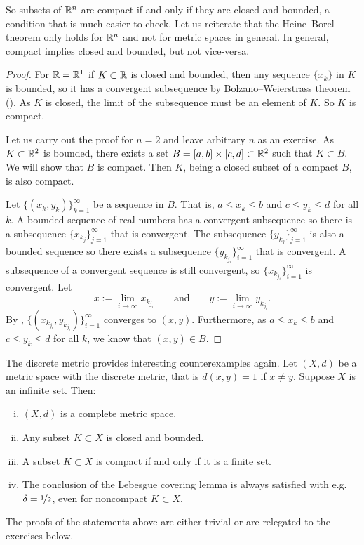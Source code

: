 So subsets of ${\mathbb{R}}^n$ are compact if and only if they are closed and bounded,
a condition that is much easier to check.
Let us reiterate that the Heine--Borel theorem only holds for ${\mathbb{R}}^n$ and not
for metric spaces in general.  In general, compact implies closed and
bounded, but not vice-versa.

\begin{proof}
For ${\mathbb{R}} = {\mathbb{R}}^1$ if $K \subset {\mathbb{R}}$ is closed and bounded, then
any sequence $\{ x_k \}$ in $K$ is bounded, so it has a convergent
subsequence by
Bolzano--Weierstrass theorem ().
As $K$ is closed, the limit of the subsequence must be an element of
$K$.  So $K$ is compact.

Let us carry out the proof for $n=2$ and leave arbitrary $n$ as an exercise.
As $K \subset {\mathbb{R}}^2$ is bounded, there exists a set
$B=[a,b]\times[c,d] \subset {\mathbb{R}}^2$ such that $K \subset B$.  We will show
that $B$ is compact.  Then $K$, being a closed subset of a compact $B$, is
also compact.  

Let $\bigl\{ (x_k,y_k) \bigr\}_{k=1}^\infty$ be a sequence in $B$.  That is,
$a \leq x_k \leq b$ and
$c \leq y_k \leq d$ for all $k$.  A bounded sequence of real numbers
has a convergent
subsequence so there is a subsequence $\{ x_{k_j} \}_{j=1}^\infty$
that is convergent.  The subsequence 
$\{ y_{k_j} \}_{j=1}^\infty$ is also a bounded sequence so there exists
a subsequence
$\{ y_{k_{j_i}} \}_{i=1}^\infty$ that is convergent.  A subsequence of a
convergent sequence is still convergent, so 
$\{ x_{k_{j_i}} \}_{i=1}^\infty$ is convergent.
Let
\begin{equation*}
x := \lim_{i\to\infty} x_{k_{j_i}}
\qquad \text{and} \qquad
y := \lim_{i\to\infty} y_{k_{j_i}} .
\end{equation*}
By ,
$\bigl\{ (x_{k_{j_i}},y_{k_{j_i}}) \bigr\}_{i=1}^\infty$ converges to $(x,y)$.
Furthermore, as $a \leq x_k \leq b$ and
$c \leq y_k \leq d$ for all $k$, we know that $(x,y) \in B$.
\end{proof}

\begin{example}
The discrete metric provides interesting counterexamples again.
Let $(X,d)$ be a metric space with the discrete metric, that is $d(x,y) = 1$
if $x \not= y$.  Suppose
$X$ is an infinite set.  Then:
\begin{enumerate}[(i)]
\item $(X,d)$ is a complete metric space.
\item Any subset $K \subset X$ is closed and bounded.
\item A subset $K \subset X$ is compact if and only if it is a finite set.
\item The conclusion of the Lebesgue covering lemma is always satisfied with
e.g. $\delta = \nicefrac{1}{2}$, even for noncompact $K \subset X$.
\end{enumerate}
The proofs
of the statements above are either trivial or are relegated to the exercises
below.
\end{example}

